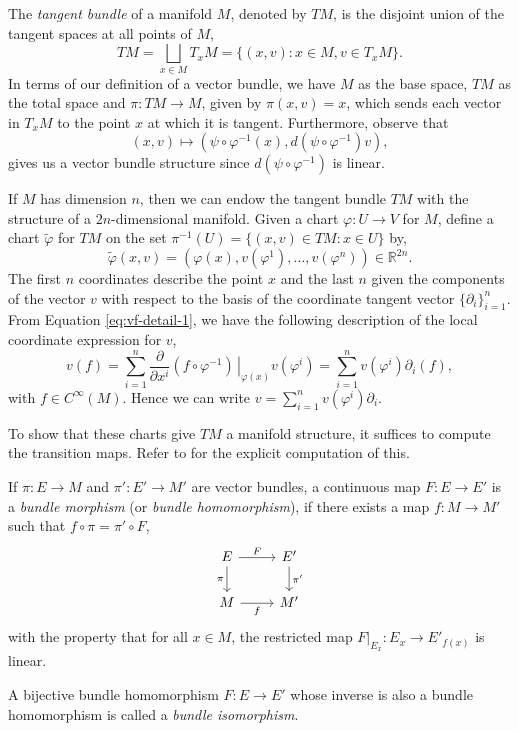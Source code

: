 \documentclass[12pt,a4paper]{article}
\begin{document}
\begin{definition}
The \textit{tangent bundle} of a manifold $M$, denoted by $TM$, is the disjoint union of the tangent spaces at all points of $M$,
\[
TM=\bigsqcup_{x\in M}T_xM=\{(x,v):x\in M,v\in T_xM\}.
\]
In terms of our definition of a vector bundle, we have $M$ as the base space, $TM$ as the total space and $\pi:TM\to M$, given by $\pi(x,v)=x$, which sends each vector in $T_xM$ to the point $x$ at which it is tangent. Furthermore, observe that
\[
(x,v)\mapsto \left(\psi\circ\varphi^{-1}(x),d(\psi\circ\varphi^{-1})v \right),
\]
gives us a vector bundle structure since $d(\psi\circ\varphi^{-1})$ is linear.
\end{definition}
If $M$ has dimension $n$, then we can endow the tangent bundle $TM$ with the structure of a $2n$-dimensional manifold. Given a chart $\varphi:U\to V$ for $M$, define a chart $\tilde{\varphi}$ for $TM$ on the set $\pi^{-1}(U)=\{(x,v)\in TM:x\in U\}$ by,
\[
\tilde{\varphi}(x,v)=\left(\varphi(x),v(\varphi^1),\ldots,v(\varphi^n) \right)\in\mathbb{R}^{2n}.
\]
The first $n$ coordinates describe the point $x$ and the last $n$ given the components of the vector $v$ with respect to the basis of the coordinate tangent vector $\{\partial_i\}_{i=1}^{n}$. From Equation \eqref{eq:vf-detail-1}, we have the following description of the local coordinate expression for $v$,
\[
v(f)=\sum_{i=1}^n\frac{\partial}{\partial x^i}\left.\left(f\circ\varphi^{-1}\right)\,\right\rvert_{\varphi(x)}v(\varphi^i)=\sum_{i=1}^nv(\varphi^i)\partial_i(f),
\]
with $f\in C^{\infty}(M)$. Hence we can write $v=\sum_{i=1}^nv(\varphi^i)\partial_i$.

To show that these charts give $TM$ a manifold structure, it suffices to compute the transition maps. Refer to \cite{MR2954043} for the explicit computation of this.


\begin{definition}
If $\pi:E\to M$ and $\pi':E'\to M'$ are vector bundles, a continuous map $F:E\to E'$ is a \textit{bundle morphism} (or \textit{bundle homomorphism}), if there exists a map $f:M\to M'$ such that $f\circ\pi=\pi'\circ F$,
\[
\begin{tikzcd}
E \arrow[r,"F"] \arrow{d}[swap]{\pi}
& E' \arrow[d,"\pi'"] \\
M \arrow{r}[swap]{f} & M'
\end{tikzcd}
\]
with the property that for all $x\in M$, the restricted map $F\rvert_{E_x}:E_x\to E'_{f(x)}$ is linear.

A bijective bundle homomorphism $F:E\to E'$ whose inverse is also a bundle homomorphism is called a \textit{bundle isomorphism}.
\end{definition}
\end{document}
